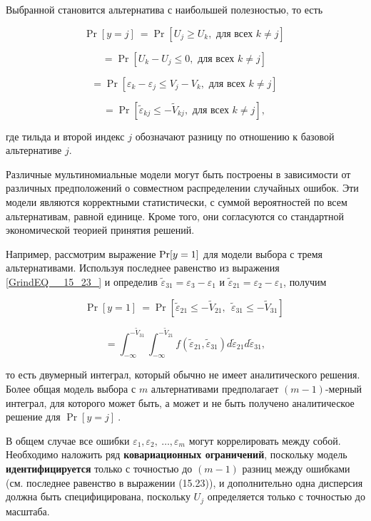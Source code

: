 Выбранной становится альтернатива с наибольшей полезностью, то есть

\begin{equation} \label{GrindEQ__15_23_} {\Pr  \left[y=j\right]\ }={\Pr  \left[U_j\ge U_k,\text{ для всех } k\ne j\right]\ } \end{equation} 

\[={\Pr  \left[U_k-U_j\le 0,\text{ для всех } k\ne j\right]\ }\] 

\[={\Pr  \left[{\varepsilon }_k-{\varepsilon }_j\le V_j-V_k,\text{ для всех } k\ne j\right]\ }\] 

\[={\Pr  \left[{\widetilde{\varepsilon }}_{kj}\le {-\tilde{V}}_{kj},\text{ для всех } k\ne j\right],\ }\] 

где тильда и второй индекс $j$ обозначают разницу по отношению к базовой альтернативе $j$.

Различные мультиномиальные модели могут быть построены в зависимости от различных предположений о совместном распределении случайных ошибок. Эти модели являются корректными статистически, с суммой вероятностей по всем альтернативам, равной единице. Кроме того, они согласуются со стандартной экономической теорией принятия решений.

Например, рассмотрим выражение ${\rm Pr}[y=1]$ для модели выбора с тремя альтернативами. Используя последнее равенство из выражения \eqref{GrindEQ__15_23_} и определив ${\widetilde{\varepsilon }}_{31}={\varepsilon }_3-{\varepsilon }_1$ и ${\widetilde{\varepsilon }}_{21}={\varepsilon }_2-{\varepsilon }_1$, получим

\begin{equation} \label{GrindEQ__15_24_} {\Pr  \left[y=1\right]\ }={\Pr  \left[{\widetilde{\varepsilon }}_{21}\le -{\tilde{V}}_{21},\ \ {\widetilde{\varepsilon }}_{31}\le -{\tilde{V}}_{31}\right]\ } \end{equation} 

\[=\int^{-{\tilde{V}}_{31}}_{-\infty }{\int^{-{\tilde{V}}_{21}}_{-\infty }{f({\widetilde{\varepsilon }}_{21},{\widetilde{\varepsilon }}_{31})d{\widetilde{\varepsilon }}_{21}d{\widetilde{\varepsilon }}_{31}}},\] 

то есть двумерный интеграл, который обычно не имеет аналитического решения. Более общая модель выбора с $m$ альтернативами предполагает $(m-1)$-мерный интеграл, для которого может быть, а может и не быть получено аналитическое решение для ${\Pr  \left[y=j\right]\ }.$

В общем случае все ошибки ${\varepsilon }_1,{\varepsilon }_2,\ \dots ,{\varepsilon }_m$ могут коррелировать между собой. Необходимо наложить ряд \textbf{ковариационных ограничений}, поскольку модель \textbf{идентифицируется} только с точностью до $(m-1)$  разниц между ошибками (см. последнее равенство в выражении (15.23)), и дополнительно одна дисперсия должна быть специфицирована, поскольку $U_j$ определяется только с точностью до масштаба.


